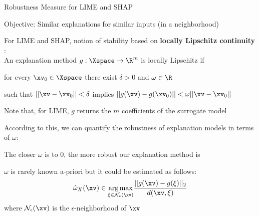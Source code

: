 \documentclass[10pt,compress,t,notes=noshow, xcolor=table]{beamer}
\begin{document}
\begin{framei}[align=top]{Robustness Measure for LIME and SHAP}
\item Objective: Similar explanations for similar inputs (in a neighborhood)
\pause
\item For LIME and SHAP, notion of stability based on \textbf{locally Lipschitz continuity} :\\
An explanation method $g:\Xspace \rightarrow \R^m$ is locally Lipschitz if
\begin{itemizeS}
\item for every $\xv_0 \in \Xspace$ there exist $\delta > 0$ and $\omega \in \R$
\item such that $||\xv - \xv_0|| < \delta$ implies $||g(\xv) - g(\xv_0)|| < \omega ||\xv - \xv_0||$
\end{itemizeS}
\begin{small}
Note that, for LIME, $g$ returns the $m$ coefficients of the surrogate model
\end{small}
\pause
\item According to this, we can quantify the robustness of explanation models in terms of $\omega$:
\begin{itemizeS}
\item[$\leadsto$] The closer $\omega$ is to 0, the more robust our explanation method is
\end{itemizeS}
\pause
\item $\omega$ is rarely known a-priori but it could be estimated as follows:
$$\hat{\omega}_{X}(\xv) \in \underset{\xi \in \mathcal{N}_{\epsilon}(\xv)}{\arg \max} \frac{||g(\xv) - g(\xi)||_2}{d(\xv, \xi)}$$
where $\mathcal{N}_{\epsilon}(\xv)$ is the $\epsilon$-neighborhood of $\xv$
\end{framei}


\end{document}
